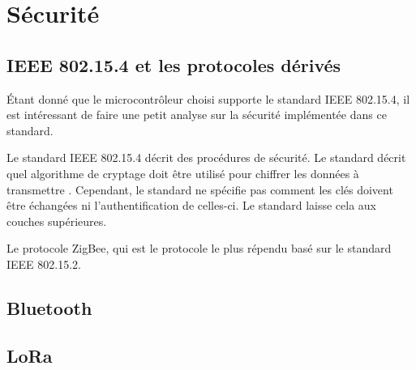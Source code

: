 \chapter{Sécurité}






\section{IEEE 802.15.4 et les protocoles dérivés}

Étant donné que le microcontrôleur choisi supporte le standard IEEE 802.15.4, il est intéressant de faire une petit analyse sur la sécurité implémentée dans ce standard. 

Le standard IEEE 802.15.4 décrit des procédures de sécurité. Le standard décrit quel algorithme de cryptage doit être utilisé pour chiffrer les données à transmettre \cite{Security81:online}. Cependant, le standard ne spécifie pas comment les clés doivent être échangées ni l'authentification de celles-ci. Le standard laisse cela aux couches supérieures. 


Le protocole ZigBee, qui est le protocole le plus répendu basé sur le standard IEEE 802.15.2.




\section{Bluetooth}




\section{LoRa}
\label{sec_lora_security}




